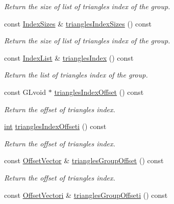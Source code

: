\begin{DoxyCompactItemize}
\begin{DoxyCompactList}\small\item\em Return the size of list of triangles index of the group. \end{DoxyCompactList}\item 
const \hyperlink{glc__global_8h_ad0cd3186041d4811de0ebb6ea411fd82}{Index\-Sizes} \& \hyperlink{class_g_l_c___primitive_group_ae766e414341820c9512f78e0fcf5a63b}{triangles\-Index\-Sizes} () const 
\begin{DoxyCompactList}\small\item\em Return the size of list of triangles index of the group. \end{DoxyCompactList}\item 
const \hyperlink{glc__global_8h_a92568854751d0cfbc27eae9c76aab7cf}{Index\-List} \& \hyperlink{class_g_l_c___primitive_group_a634175c9a354954563782a3720302267}{triangles\-Index} () const 
\begin{DoxyCompactList}\small\item\em Return the list of triangles index of the group. \end{DoxyCompactList}\item 
const G\-Lvoid $\ast$ \hyperlink{class_g_l_c___primitive_group_a92c1a69cd006861a9b679fc547897749}{triangles\-Index\-Offset} () const 
\begin{DoxyCompactList}\small\item\em Return the offset of triangles index. \end{DoxyCompactList}\item 
\hyperlink{ioapi_8h_a787fa3cf048117ba7123753c1e74fcd6}{int} \hyperlink{class_g_l_c___primitive_group_a005380d47e9d2a197b0d819c5b3a9ef4}{triangles\-Index\-Offseti} () const 
\begin{DoxyCompactList}\small\item\em Return the offset of triangles index. \end{DoxyCompactList}\item 
const \hyperlink{glc__global_8h_a3edb58ebf0cc44d83eec31a509175651}{Offset\-Vector} \& \hyperlink{class_g_l_c___primitive_group_a37b197225f01d8de6493eef4985ecd2d}{triangles\-Group\-Offset} () const 
\begin{DoxyCompactList}\small\item\em Return the offset of triangles index. \end{DoxyCompactList}\item 
const \hyperlink{glc__global_8h_a023e9bc3950160925c44bfc2f093f25b}{Offset\-Vectori} \& \hyperlink{class_g_l_c___primitive_group_acf4e3d69f31f8cec30c2df88f78aa020}{triangles\-Group\-Offseti} () const 

\end{DoxyCompactItemize}
